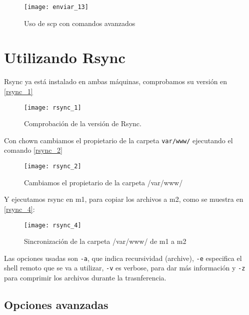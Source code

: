 \begin{figure}
\begin{center}
\caption{Uso de scp con comandos avanzados}
\label{enviar_13}
\texttt{[image: enviar\_13]}
\end{center}
\end{figure}


\chapter{Utilizando Rsync}

Rsync ya está instalado en ambas máquinas, comprobamos su versión en \eqref{rsync_1}

\begin{figure}
\begin{center}
\caption{Comprobación de la versión de Rsync.}
\label{rsync_1}
\texttt{[image: rsync\_1]}
\end{center}
\end{figure}

Con chown cambiamos el propietario de la carpeta \verb|var/www/| ejecutando el comando \eqref{rsync_2}

\begin{figure}
\begin{center}
\caption{Cambiamos el propietario de la carpeta /var/www/}
\label{rsync_2}
\texttt{[image: rsync\_2]}
\end{center}
\end{figure}

Y ejecutamos rsync en m1, para copiar los archivos a m2, como se muestra en \eqref{rsync_4}:

\begin{figure}
\begin{center}
\caption{Sincronización de la carpeta /var/www/ de m1 a m2}
\label{rsync_4}
\texttt{[image: rsync\_4]}
\end{center}
\end{figure}

Las opciones usadas son \verb|-a|, que indica recursividad (archive), \verb|-e| especifica el shell remoto que se va a utilizar, \verb|-v| es verbose, para dar más información y \verb|-z| para comprimir los archivos durante la trasnferencia.

\section{Opciones avanzadas}

